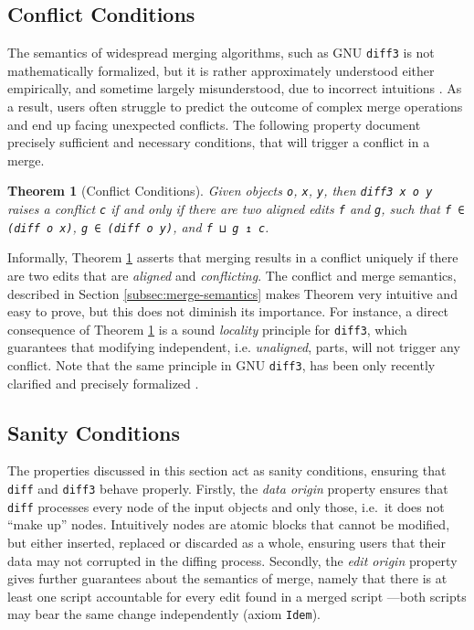 \documentclass{sigplanconf}
\theoremstyle{plain}
\newtheorem{thm}{Theorem}
\begin{document}
\subsection{Conflict Conditions}
The semantics of widespread merging algorithms, such as GNU
\texttt{diff3} is not mathematically formalized, but it is rather
approximately understood either empirically, and sometime largely
misunderstood, due to incorrect intuitions \cite{PierceDiff3}.
%
As a result, users often struggle to predict the outcome of complex
merge operations and end up facing unexpected conflicts.
%
The following property document precisely sufficient and necessary
conditions, that will trigger a conflict in a merge.
%
\begin{thm}[Conflict Conditions]
\label{thm:conflict-conds}
  Given objects \texttt{o}, \texttt{x}, \texttt{y}, 
  then \texttt{diff3 x o y} raises a conflict \texttt{c} if and only if
  there are two aligned edits \texttt{f} and \texttt{g}, such that
  \texttt{f ∈ (diff o x)}, \texttt{g ∈ (diff o y)}, and \texttt{f ⊔ g ↥ c}.
\end{thm}
Informally, Theorem \ref{thm:conflict-conds} asserts that merging
results in a conflict uniquely if there are two edits that are
\emph{aligned} and \emph{conflicting}.
%
The conflict and merge semantics, described in Section
\ref{subsec:merge-semantics} makes Theorem very intuitive and easy to
prove, but this does not diminish its importance.
%
For instance, a direct consequence of Theorem \ref{thm:conflict-conds}
is a sound \emph{locality} principle for \texttt{diff3}, which
guarantees that modifying independent, i.e. \emph{unaligned}, parts,
will not trigger any conflict.
%
Note that the same principle in GNU \texttt{diff3}, has been only
recently clarified and precisely formalized \cite{PierceDiff3}.

\subsection{Sanity Conditions}
The properties discussed in this section act as sanity conditions,
ensuring that \texttt{diff} and \texttt{diff3} behave properly.
%
Firstly, the \emph{data origin} property ensures that \texttt{diff}
processes every node of the input objects and only those, i.e.\ it
does not ``make up'' nodes.
%
Intuitively nodes are atomic blocks that cannot be modified, but
either inserted, replaced or discarded as a whole, ensuring users that
their data may not corrupted in the diffing process.
%
Secondly, the \emph{edit origin} property gives further guarantees
about the semantics of merge, namely that there is at least one script
accountable for every edit found in a merged script ---both scripts
may bear the same change independently (axiom \texttt{Idem}).
%
%
\end{document}
